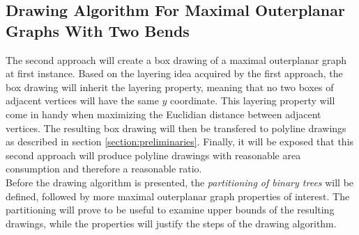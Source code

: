 \subsection{Drawing Algorithm For Maximal Outerplanar Graphs With Two Bends}
The second approach will create a box drawing of a maximal outerplanar graph at first instance. Based on the layering idea acquired by the first approach, the box drawing will inherit the layering property, meaning that no two boxes of adjacent vertices will have the same $y$ coordinate. This layering property will come in handy when maximizing the Euclidian distance between adjacent vertices. The resulting box drawing will then be transfered to polyline drawings as described in section \ref{section:preliminaries}. Finally, it will be exposed that this second approach will produce polyline drawings with reasonable area consumption and therefore a reasonable ratio.\\
Before the drawing algorithm is presented, the \emph{partitioning of binary trees} will be defined, followed by more maximal outerplanar graph properties of interest. The partitioning will prove to be useful to examine upper bounds of the resulting drawings, while the properties will justify the steps of the drawing algorithm.
